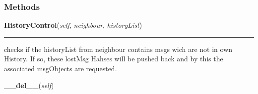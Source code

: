 
  \subsubsection{Methods}

    \label{peer:Peer:HistoryControl}

    \vspace{0.5ex}

\hspace{.8\funcindent}\begin{boxedminipage}{\funcwidth}

    \raggedright \textbf{HistoryControl}(\textit{self}, \textit{neighbour}, \textit{historyList})

    \vspace{-1.5ex}

    \rule{\textwidth}{0.5\fboxrule}
\setlength{\parskip}{2ex}
    checks if the historyList from neighbour contains msgs wich are not in 
    own History. If so, these lostMsg Hahses will be pushed back and by 
    this the associated msgObjects are requested.

\setlength{\parskip}{1ex}
    \end{boxedminipage}

    \label{peer:Peer:__del__}

    \vspace{0.5ex}

\hspace{.8\funcindent}\begin{boxedminipage}{\funcwidth}

    \raggedright \textbf{\_\_del\_\_}(\textit{self})

\setlength{\parskip}{2ex}
\setlength{\parskip}{1ex}
    \end{boxedminipage}

    \label{peer:Peer:__init__}

    \vspace{0.5ex}

